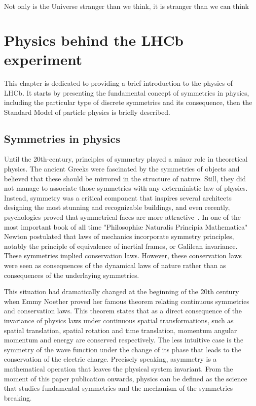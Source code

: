 \begin{savequote}[75mm]
Not only is the Universe stranger than we think, it is stranger than we can think
\end{savequote}

\chapter{Physics behind the LHCb experiment }
\label{chapter:physics}

This chapter is dedicated to providing a brief introduction to the physics of LHCb. It starts by presenting the fundamental concept of symmetries in physics, including the particular type of discrete symmetries and its consequence, then the Standard Model of particle physics is briefly described. 

\section{Symmetries in physics}
Until the 20th-century, principles of symmetry played a minor role in theoretical physics. The ancient Greeks were fascinated by the symmetries of objects and believed that these should be mirrored in the structure of nature. Still, they did not manage to associate those symmetries with any deterministic law of physics. Instead, symmetry was a critical component that inspires several architects designing the most stunning and recognizable buildings, and even recently, psychologies proved that symmetrical faces are more attractive~\cite{faces}. 
In one of the most important book of all time "Philosophiæ Naturalis Principia Mathematica"~\cite{newton} 
Newton postulated that laws of mechanics incorporate symmetry principles, notably the principle of equivalence of inertial frames, or Galilean invariance. These symmetries implied conservation laws. However, these conservation laws were seen as consequences of the dynamical laws of nature rather than as consequences of the underlaying symmetries.  

This situation had dramatically changed at the beginning of the 20th century when Emmy Noether proved her famous theorem relating continuous symmetries and conservation laws.
This theorem states that as a direct consequence of the invariance of physics laws under continuous spatial transformations, such as spatial translation, spatial rotation and time translation, momentum angular momentum and energy are conserved respectively. The less intuitive case is the symmetry of the wave function under the change of its phase that leads to the conservation of the electric charge. Precisely speaking, asymmetry is a mathematical operation that leaves the physical system invariant. 
From the moment of this paper publication onwards, physics can be defined as the science that studies fundamental symmetries and the mechanism of the symmetries breaking.  

